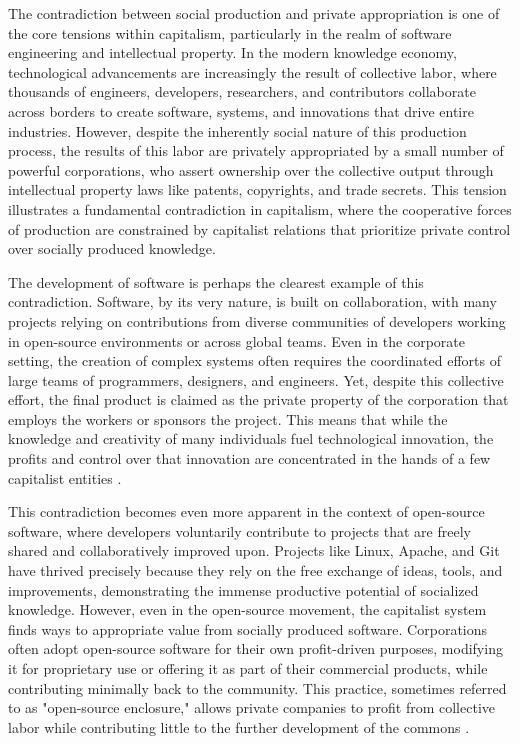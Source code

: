 \begin{refsection}
The contradiction between social production and private appropriation is one of the core tensions within capitalism, particularly in the realm of software engineering and intellectual property. In the modern knowledge economy, technological advancements are increasingly the result of collective labor, where thousands of engineers, developers, researchers, and contributors collaborate across borders to create software, systems, and innovations that drive entire industries. However, despite the inherently social nature of this production process, the results of this labor are privately appropriated by a small number of powerful corporations, who assert ownership over the collective output through intellectual property laws like patents, copyrights, and trade secrets. This tension illustrates a fundamental contradiction in capitalism, where the cooperative forces of production are constrained by capitalist relations that prioritize private control over socially produced knowledge.

The development of software is perhaps the clearest example of this contradiction. Software, by its very nature, is built on collaboration, with many projects relying on contributions from diverse communities of developers working in open-source environments or across global teams. Even in the corporate setting, the creation of complex systems often requires the coordinated efforts of large teams of programmers, designers, and engineers. Yet, despite this collective effort, the final product is claimed as the private property of the corporation that employs the workers or sponsors the project. This means that while the knowledge and creativity of many individuals fuel technological innovation, the profits and control over that innovation are concentrated in the hands of a few capitalist entities \cite[pp.~264-266]{marx1867}.

This contradiction becomes even more apparent in the context of open-source software, where developers voluntarily contribute to projects that are freely shared and collaboratively improved upon. Projects like Linux, Apache, and Git have thrived precisely because they rely on the free exchange of ideas, tools, and improvements, demonstrating the immense productive potential of socialized knowledge. However, even in the open-source movement, the capitalist system finds ways to appropriate value from socially produced software. Corporations often adopt open-source software for their own profit-driven purposes, modifying it for proprietary use or offering it as part of their commercial products, while contributing minimally back to the community. This practice, sometimes referred to as "open-source enclosure," allows private companies to profit from collective labor while contributing little to the further development of the commons \cite[pp.~12-14]{stallman2002}.


\end{refsection}
